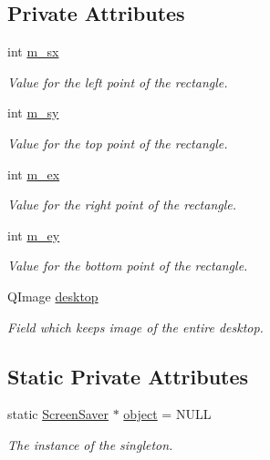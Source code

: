 \subsection*{Private Attributes}
\begin{DoxyCompactItemize}
\item 
int \hyperlink{class_screen_saver_a492aa831394b15bbdf2c85e99c1af87c}{m\-\_\-sx}
\begin{DoxyCompactList}\small\item\em Value for the left point of the rectangle. \end{DoxyCompactList}\item 
int \hyperlink{class_screen_saver_a2a8ec41c3b6fc61e762bd6d8d8f7e347}{m\-\_\-sy}
\begin{DoxyCompactList}\small\item\em Value for the top point of the rectangle. \end{DoxyCompactList}\item 
int \hyperlink{class_screen_saver_aa55489d28b7e42b4b75db156bcb3a141}{m\-\_\-ex}
\begin{DoxyCompactList}\small\item\em Value for the right point of the rectangle. \end{DoxyCompactList}\item 
int \hyperlink{class_screen_saver_a958952da235541d076867e1ee51b5d5a}{m\-\_\-ey}
\begin{DoxyCompactList}\small\item\em Value for the bottom point of the rectangle. \end{DoxyCompactList}\item 
Q\-Image \hyperlink{class_screen_saver_a02d489a9a5ff5777d0aa29f8552efe35}{desktop}
\begin{DoxyCompactList}\small\item\em Field which keeps image of the entire desktop. \end{DoxyCompactList}\end{DoxyCompactItemize}
\subsection*{Static Private Attributes}
\begin{DoxyCompactItemize}
\item 
static \hyperlink{class_screen_saver}{Screen\-Saver} $\ast$ \hyperlink{class_screen_saver_a2ec2b57eec392500275d7f9afc76859d}{object} = N\-U\-L\-L
\begin{DoxyCompactList}\small\item\em The instance of the singleton. \end{DoxyCompactList}\end{DoxyCompactItemize}


